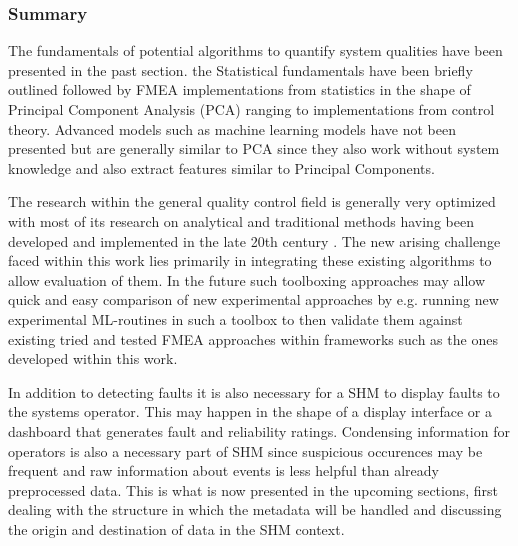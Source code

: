 \newpage

\subsubsection{Summary}
The fundamentals of potential algorithms to quantify system qualities have been presented in the past section. the Statistical fundamentals have been briefly outlined followed by FMEA implementations from statistics in the shape of Principal Component Analysis (PCA) ranging to implementations from control theory. Advanced models such as machine learning models have not been presented but are generally similar to PCA since they also work without system knowledge and also extract features similar to Principal Components.



The research within the general quality control field is generally very optimized with most of its research on analytical and traditional methods having been developed and implemented in the late 20th century \cite{isermann_fault-diagnosis_2011}. The new arising challenge faced within this work lies primarily in integrating these existing algorithms to allow evaluation of them. In the future such toolboxing approaches may allow quick and easy comparison of new experimental approaches by e.g. running new experimental ML-routines in such a toolbox to then validate them against existing tried and tested FMEA approaches within frameworks such as the ones developed within this work.

In addition to detecting faults it is also necessary for a SHM to display faults to the systems operator. This may happen in the shape of a display interface or a dashboard that generates fault and reliability ratings. Condensing information for operators is also a necessary part of SHM since suspicious occurences may be frequent and raw information about events is less helpful than already preprocessed data. This is what is now presented in the upcoming sections, first dealing with the structure in which the metadata will be handled and discussing the origin and destination of data in the SHM context.

